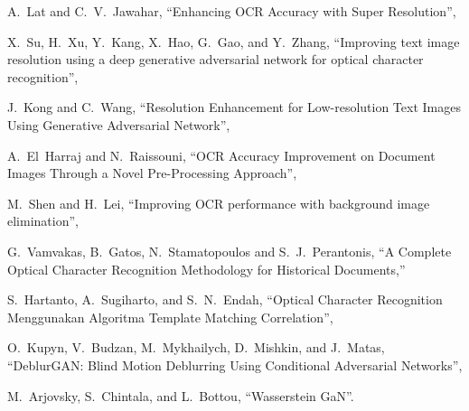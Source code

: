 \documentclass[uplatex, twocolumn,10pt]{jsarticle}
\begin{document}
\begin{thebibliography}{99}
    A.~Lat and C.~V.~Jawahar,
    \newblock “Enhancing OCR Accuracy with Super Resolution”,
    
    X.~Su, H.~Xu, Y.~Kang, X.~Hao, G.~Gao, and Y.~Zhang,
    \newblock “Improving text image resolution using a deep generative adversarial network for optical character recognition”,
    
    J.~Kong and C.~Wang,
    \newblock “Resolution Enhancement for Low-resolution Text Images Using Generative Adversarial Network”,
    
    A.~El~Harraj and N.~Raissouni,
    \newblock “OCR Accuracy Improvement on Document Images Through a Novel Pre-Processing Approach”,
    
    M.~Shen and H.~Lei,
    \newblock “Improving OCR performance with background image elimination”,
    
    G.~Vamvakas, B.~Gatos, N.~Stamatopoulos and S.~J.~Perantonis,
    \newblock “A Complete Optical Character Recognition Methodology for Historical Documents,”
    
    S.~Hartanto, A.~Sugiharto, and S.~N.~Endah, 
    \newblock “Optical Character Recognition Menggunakan Algoritma Template Matching Correlation”, 
    
    O.~Kupyn, V.~Budzan, M.~Mykhailych, D.~Mishkin, and J.~Matas,
    \newblock “DeblurGAN: Blind Motion Deblurring Using Conditional Adversarial Networks”,
    
    M.~Arjovsky, S.~Chintala, and L.~Bottou, 
    \newblock “Wasserstein GaN”.
    

\end{thebibliography}
\end{document}
